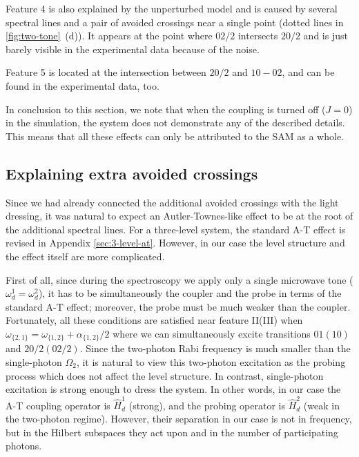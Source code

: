 \documentclass[%
 aps, prx,
 amsmath,amssymb,
 reprint,%
superscriptaddress
]{revtex4-2}
\begin{document}
Feature 4 is also explained by the unperturbed 
model and is caused by several spectral lines and 
a pair of avoided crossings near a single point 
(dotted lines in \autoref{fig:two-tone}~(d)). It 
appears at the point where ${02/2}$ intersects 
${20/2}$ and is just barely visible in the 
experimental data because of the noise. 

Feature 5 is located at the intersection between ${20/2}$ 
and ${10} - {02}$, and can be 
found in the experimental data, too. 

In conclusion to this section, we note that when the coupling is turned off ($J=0$) in the simulation, the system does not demonstrate any of the described details. This means that all these effects can only be attributed to the SAM as a whole. 

\subsection{Explaining extra avoided crossings}\label{sec:theory}

Since we had already connected the additional 
avoided crossings with the light dressing, it was 
natural to expect an Autler-Townes-like effect to 
be at the root of the additional spectral lines. 
For a three-level system, the standard A-T effect 
is revised in Appendix \ref{sec:3-level-at}. 
However, in our case the level structure and the 
effect itself are more complicated. 

First of all, since during the spectroscopy we 
apply only a single microwave tone ($\omega_d^1 = 
\omega_d^2$), it has to be 
simultaneously the coupler and the probe
in terms of the standard A-T effect; moreover, the 
probe must be much weaker than the coupler. 
Fortunately, all these conditions are satisfied near feature II(III) when 
$\omega_{\{2,1\}} = 
\omega_{\{1,2\}}+\alpha_{\{1,2\}}/2$  where we 
can simultaneously excite transitions $01 (10)$ 
and $20/2 (02/2)$. Since the two-photon Rabi 
frequency is much smaller than the single-photon 
$\Omega_2$, it is natural to view this two-photon 
excitation as the probing process which does not 
affect the level structure. In contrast, 
single-photon excitation is strong enough to 
dress the system. In other words, in our case the 
A-T coupling operator is $\hat H_{d}^1$ (strong), 
and the probing operator is $\hat H_{d}^2$ (weak 
in the two-photon regime). However, their 
separation in our case is not in frequency, but 
in the Hilbert subspaces they act upon and in the number of participating photons.
\end{document}
